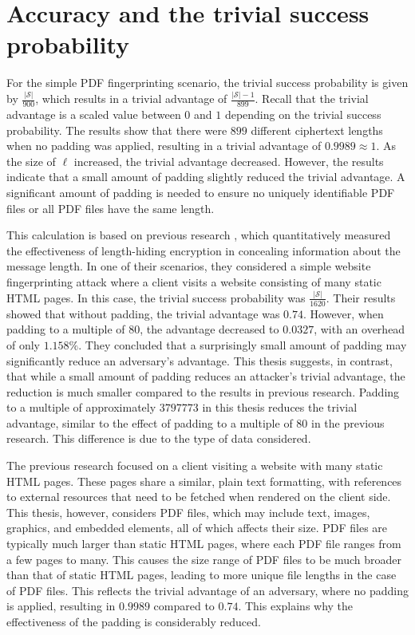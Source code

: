 \section{Accuracy and the trivial success probability\label{sec:trivadv-discussion}}

For the simple PDF fingerprinting scenario, the trivial success probability is given by $\tfrac{|\mathcal{S}|}{900}$, which results in a trivial advantage of $\tfrac{|\mathcal{S}|-1}{899}$. Recall that the trivial advantage is a scaled value between $0$ and $1$ depending on the trivial success probability. The results show that there were $899$ different ciphertext lengths when no padding was applied, resulting in a trivial advantage of $0.9989 \approx 1$. As the size of $\ell$ increased, the trivial advantage decreased. However, the results indicate that a small amount of padding slightly reduced the trivial advantage. A significant amount of padding is needed to ensure no uniquely identifiable PDF files or all PDF files have the same length.

This calculation is based on previous research \cite{DBLP:conf/ctrsa/GellertJLN22}, which quantitatively measured the effectiveness of length-hiding encryption in concealing information about the message length. In one of their scenarios, they considered a simple website fingerprinting attack where a client visits a website consisting of many static HTML pages. In this case, the trivial success probability was $\tfrac{|\mathcal{S}|}{1620}$. Their results showed that without padding, the trivial advantage was $0.74$. However, when padding to a multiple of $80$, the advantage decreased to $0.0327$, with an overhead of only $1.158\%$. They concluded that a surprisingly small amount of padding may significantly reduce an adversary's advantage. This thesis suggests, in contrast, that while a small amount of padding reduces an attacker's trivial advantage, the reduction is much smaller compared to the results in previous research. Padding to a multiple of approximately $3797773$ in this thesis reduces the trivial advantage, similar to the effect of padding to a multiple of $80$ in the previous research. This difference is due to the type of data considered.

The previous research focused on a client visiting a website with many static HTML pages. These pages share a similar, plain text formatting, with references to external resources that need to be fetched when rendered on the client side. This thesis, however, considers PDF files, which may include text, images, graphics, and embedded elements, all of which affects their size. PDF files are typically much larger than static HTML pages, where each PDF file ranges from a few pages to many. This causes the size range of PDF files to be much broader than that of static HTML pages, leading to more unique file lengths in the case of PDF files. This reflects the trivial advantage of an adversary, where no padding is applied, resulting in $0.9989$ compared to $0.74$. This explains why the effectiveness of the padding is considerably reduced.

